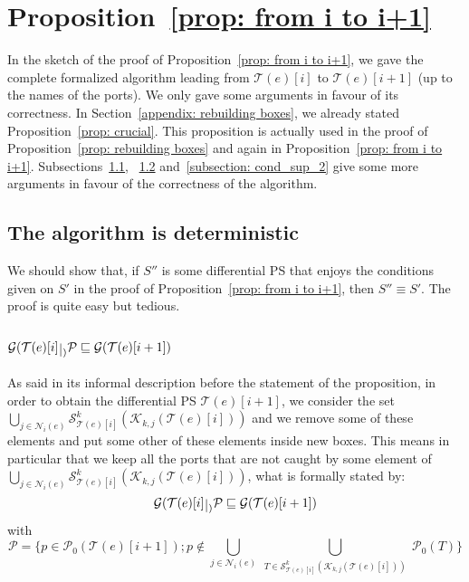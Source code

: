 \documentclass{article}
\theoremstyle{plain}
\newcommand{\nontrivialconnected}[3]{\mathcal{S}_{#1}^{#3}(#2)}
\newcommand{\taylor}[2]{\mathcal{T}(#1)[#2]}
\newcommand{\criticalports}[3]{\mathcal{K}_{#2, #3}(#1)}
\newcommand{\groundof}[1]{\mathcal{G}(#1)}
\def\restriction#1#2{\mathchoice
              {\setbox1\hbox{${\displaystyle #1}_{\scriptstyle #2}$}
              \restrictionaux{#1}{#2}}
              {\setbox1\hbox{${\textstyle #1}_{\scriptstyle #2}$}
              \restrictionaux{#1}{#2}}
              {\setbox1\hbox{${\scriptstyle #1}_{\scriptscriptstyle #2}$}
              \restrictionaux{#1}{#2}}
              {\setbox1\hbox{${\scriptscriptstyle #1}_{\scriptscriptstyle #2}$}
              \restrictionaux{#1}{#2}}}
\def\restrictionaux#1#2{{#1\,\smash{\vrule height .8\ht1 depth .85\dp1}}_{\,#2}}
\newcommand{\portsatzero}[1]{\mathcal{P}_0(#1)}
\begin{document}
\section{Proposition~\ref{prop: from i to i+1}}

In the sketch of the proof of Proposition~\ref{prop: from i to i+1}, we gave the complete formalized algorithm leading from $\taylor{e}{i}$ to $\taylor{e}{i+1}$ (up to the names of the ports). We only gave some arguments in favour of its correctness. In Section~\ref{appendix: rebuilding boxes}, we already stated Proposition~\ref{prop: crucial}. This proposition is actually used in the proof of Proposition~\ref{prop: rebuilding boxes} and again in Proposition~\ref{prop: from i to i+1}. Subsections~\ref{subsection: deterministic}, ~\ref{subsection: cond_sup_1} and~\ref{subsection: cond_sup_2} give some more arguments in favour of the correctness of the algorithm. 

\subsection{The algorithm is deterministic}\label{subsection: deterministic}

We should show that, if $S''$ is some differential PS that enjoys the conditions given on $S'$ in the proof of Proposition~\ref{prop: from i to i+1}, then $S'' \equiv S'$. The proof is quite easy but tedious.

\subsection{$\groundof{\restriction{\taylor{e}{i}}}{\mathcal{P}} \sqsubseteq \groundof{\taylor{e}{i+1}}$}\label{subsection: cond_sup_1}

As said in its informal description before the statement of the proposition, in order to obtain the differential PS $\taylor{e}{i+1}$, we consider the set $\bigcup_{j \in \mathcal{N}_i(e)} \nontrivialconnected{\taylor{e}{i}}{\criticalports{\taylor{e}{i}}{k}{j}}{k}$ and we remove some of these elements and put some other of these elements inside new boxes. This means in particular that we keep all the ports that are not caught by some element of $\bigcup_{j \in \mathcal{N}_i(e)} \nontrivialconnected{\taylor{e}{i}}{\criticalports{\taylor{e}{i}}{k}{j}}{k}$, what is formally stated by:
$$\groundof{\restriction{\taylor{e}{i}}}{\mathcal{P}} \sqsubseteq \groundof{\taylor{e}{i+1}}$$
with 
$$\mathcal{P} =  \{ p \in \portsatzero{\taylor{e}{i+1}} ; p \notin \bigcup_{j \in \mathcal{N}_i(e)} \bigcup_{\begin{array}{c} T \in \nontrivialconnected{\taylor{e}{i}}{\criticalports{\taylor{e}{i}}{k}{j}}{k} \end{array}} \portsatzero{T} \}$$
\end{document}
